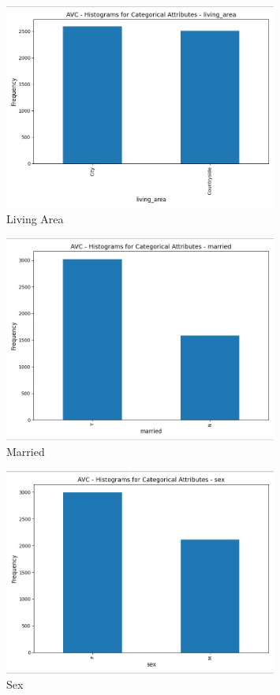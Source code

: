 \documentclass[a4paper,12pt]{article}
\begin{document}
\begin{figure}[H]
    \centering
    \includegraphics[width=0.8\textwidth]{Resources/histogram_living_area.jpeg}
    \caption{Living Area}
\end{figure}

\begin{figure}[H]
    \centering
    \includegraphics[width=0.8\textwidth]{Resources/histogram_married.jpeg}
    \caption{Married}
\end{figure}

\begin{figure}[H]
    \centering
    \includegraphics[width=0.8\textwidth]{Resources/histogram_sex.jpeg}
    \caption{Sex}
\end{figure}
\end{document}
